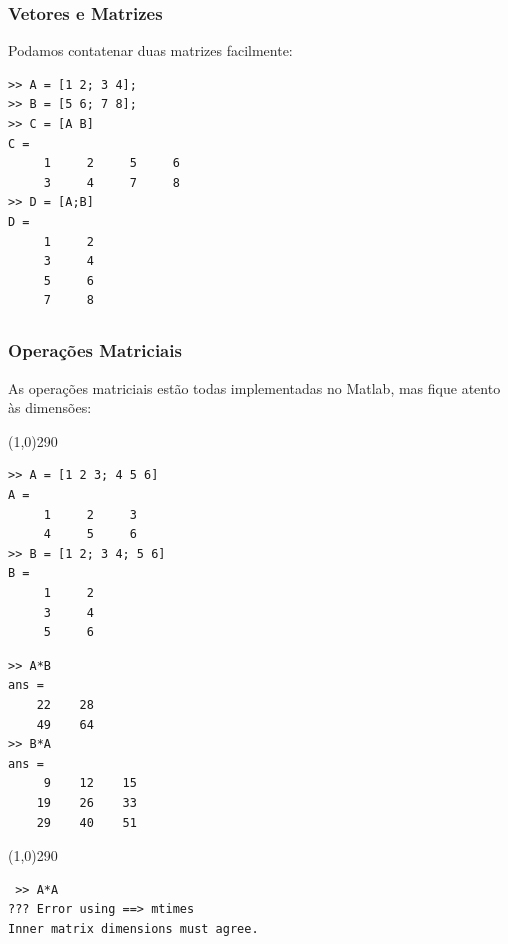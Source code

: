 \documentclass{beamer}
\newcommand{\delim}{\line(1,0){290}}
\begin{document}
\begin{frame}[fragile]
\frametitle{Vetores e Matrizes}
Podamos contatenar duas matrizes facilmente:
\begin{verbatim}
>> A = [1 2; 3 4];
>> B = [5 6; 7 8];
>> C = [A B]
C =
     1     2     5     6
     3     4     7     8
>> D = [A;B]
D =
     1     2
     3     4
     5     6
     7     8
\end{verbatim}
\end{frame}

\subsection[Opera\c{c}\~oes Matriciais]{}

\begin{frame}[fragile]
\frametitle{Opera\c{c}\~oes Matriciais}

As opera\c{c}\~oes matriciais est\~ao todas implementadas no Matlab, mas fique atento \`as dimens\~oes:

\delim
{\scriptsize
\begin{center}
\begin{minipage}{4 cm}
\begin{verbatim}
>> A = [1 2 3; 4 5 6]
A =
     1     2     3
     4     5     6
>> B = [1 2; 3 4; 5 6]
B =
     1     2
     3     4
     5     6
\end{verbatim}
\end{minipage}\hspace{1.5 cm}
\begin{minipage}{4 cm}
\begin{verbatim}
>> A*B
ans =
    22    28
    49    64
>> B*A
ans =
     9    12    15
    19    26    33
    29    40    51
\end{verbatim}
\end{minipage}
\end{center}
\delim
\begin{center}
\begin{minipage}{6 cm}
\begin{verbatim}
 >> A*A
??? Error using ==> mtimes
Inner matrix dimensions must agree.
\end{verbatim}
\end{minipage}
\end{center}
}

\end{frame}
\end{document}
